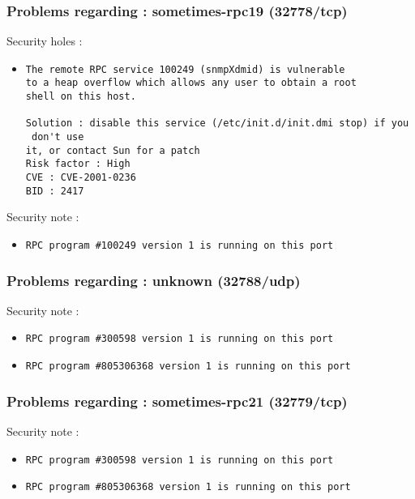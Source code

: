 \documentclass{article}
\begin{document}
\subsubsection{Problems regarding : sometimes-rpc19 (32778/tcp)}
Security holes :\\
\begin{itemize}
\item \begin{verbatim}
The remote RPC service 100249 (snmpXdmid) is vulnerable
to a heap overflow which allows any user to obtain a root
shell on this host.

Solution : disable this service (/etc/init.d/init.dmi stop) if you
 don't use
it, or contact Sun for a patch
Risk factor : High
CVE : CVE-2001-0236
BID : 2417
\end{verbatim}\end{itemize}
Security note :\\
\begin{itemize}
\item \begin{verbatim}
RPC program #100249 version 1 is running on this port
\end{verbatim}\end{itemize}
\subsubsection{Problems regarding : unknown (32788/udp)}
Security note :\\
\begin{itemize}
\item \begin{verbatim}
RPC program #300598 version 1 is running on this port
\end{verbatim}\item \begin{verbatim}
RPC program #805306368 version 1 is running on this port
\end{verbatim}\end{itemize}
\subsubsection{Problems regarding : sometimes-rpc21 (32779/tcp)}
Security note :\\
\begin{itemize}
\item \begin{verbatim}
RPC program #300598 version 1 is running on this port
\end{verbatim}\item \begin{verbatim}
RPC program #805306368 version 1 is running on this port
\end{verbatim}\end{itemize}
\end{document}
